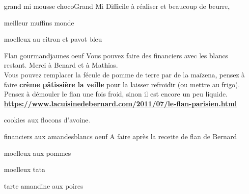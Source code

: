 	\begin{recette}{grand mi mousse choco}{Grand Mi}
		Difficile à réaliser et beaucoup de beurre, 
	\end{recette}
	
	\begin{recette}{meilleur muffins monde}{}
	\end{recette}
	
	\begin{recette}{moelleux au citron et pavot bleu}{}
	\end{recette}
	
	\begin{recette}{\heart Flan gourmand}{jaunes oeuf}
		Vous pouvez faire des financiers avec les blancs restant. Merci à Benard et à Mathias.
		\\Vous pouvez remplacer la fécule de pomme de terre par de la maïzena, pensez à faire \textbf{crème pâtissière la veille} pour la laisser refroidir (ou mettre au frigo).
		\\Pensez à démouler le flan une fois froid, sinon il est encore un peu liquide.\medskip
		\\\textbf{\url{https://www.lacuisinedebernard.com/2011/07/le-flan-parisien.html}}
	\end{recette}
	
	\begin{recette}{\heart cookies aux flocons d'avoine.}{}
	\end{recette}
	
	\begin{recette}{\heart financiers aux amandes}{blancs oeuf}
		A faire après la recette de flan de Bernard
	\end{recette}
	
	\begin{recette}{moelleux aux pommes}{}
	\end{recette}
	
	\begin{recette}{moelleux tata}{}
	\end{recette}

	\begin{recette}{tarte amandine aux poires}{}
	\end{recette}
	
